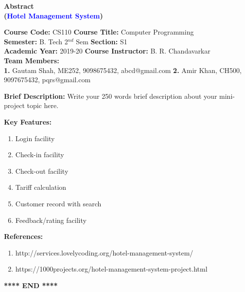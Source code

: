 \documentclass[12pt]{article}
\begin{document}


\begin{center}
    \textbf{\Large{Abstract \\
    (\textcolor{blue}{Hotel Management System})}}
\end{center}

\noindent 
\textbf{Course Code:} CS110 
\hspace{2in} 
\textbf{Course Title:} Computer Programming \\
\textbf{Semester:} B. Tech 2$^{nd}$ Sem 
\hspace{1.6in} 
\textbf{Section:} S1 \\
\textbf{Academic Year:} 2019-20 
\hspace{1.8in} 
\textbf{Course Instructor:} B. R. Chandavarkar \\
\textbf{Team Members:} \\
\textbf{1.} Gautam Shah, ME252, 9098675432, abcd@gmail.com 
\newline
\textbf{2.} Amir Khan, CH500, 9097675432, pqrs@gmail.com

\vspace{0.25in}

\noindent
\textbf{Brief Description:}
\newline
Write your 250 words brief description about your mini-project topic here.

\noindent
\textbf{Key Features:}
\begin{enumerate}
    \item Login facility
    \item Check-in facility
    \item Check-out facility
    \item Tariff calculation
    \item Customer record with search
    \item Feedback/rating facility
\end{enumerate}

\noindent
\textbf{References:}
\begin{enumerate}
    \item http://services.lovelycoding.org/hotel-management-system/
    \item https://1000projects.org/hotel-management-system-project.html
\end{enumerate}


\begin{center}
    \textbf{**** END ****}
\end{center}
\end{document}
